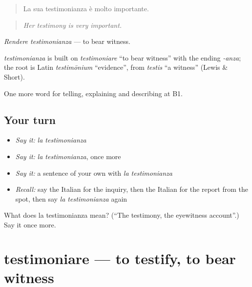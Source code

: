 \begin{quote}
La sua testimonianza è molto importante.
\end{quote}

\begin{quote}
\emph{Her testimony is very important.}
\end{quote}

\emph{Rendere testimonianza} — to bear witness.

\begin{cousinweb}
\emph{testimonianza} is built on \emph{testimoniare} \textquotedblleft{}to bear witness\textquotedblright{} with the ending \emph{-anza}; the root is Latin \emph{testimōnium} \textquotedblleft{}evidence\textquotedblright{}, from \emph{testis} \textquotedblleft{}a witness\textquotedblright{} (Lewis \& Short).
\end{cousinweb}

\begin{grammarlens}[title={What you've built}]
One more word for telling, explaining and describing at B1.
\end{grammarlens}

\subsection*{Your turn}
\begin{itemize}
\raggedright
  \item \emph{Say it:} \emph{la testimonianza}
  \item \emph{Say it:} \emph{la testimonianza}, once more
  \item \emph{Say it:} a sentence of your own with \emph{la testimonianza}
  \item \emph{Recall:} say the Italian for the inquiry, then the Italian for the report from the spot, then say \emph{la testimonianza} again
\end{itemize}

\begin{tcolorbox}[breakable,colback=teal!4,colframe=teal!35!black,title={Before you move on}]
What does la testimonianza mean? (\textquotedblleft{}The testimony, the eyewitness account\textquotedblright{}.) Say it once more.
\end{tcolorbox}
\section[testimoniare]{testimoniare — to testify, to bear witness}

\label{lesson:IT-C284-testimoniare}



